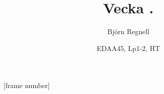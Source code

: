 [frame number]



\title[Föreläsning, EDAA45 pgk, Björn Regnell, senast uppdaterad: \today]{Vecka \vecka. \veckotema}
\author{Björn Regnell}
\date{EDAA45, Lp1-2, HT \CurrentYear}


